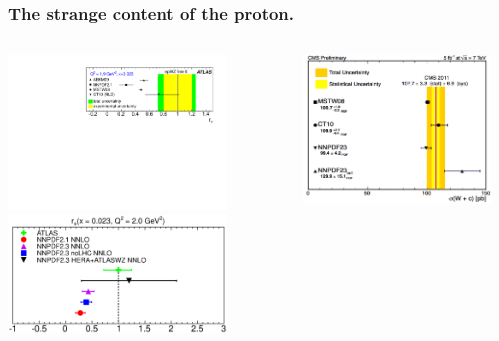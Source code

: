 \documentclass[10pt]{beamer}
\begin{document}
\begin{frame}
\frametitle{The strange content of the proton.}

    \begin{columns}
  \begin{column}{0.5\textwidth}
  \begin{center}
     \includegraphics[width=0.8\textwidth]{fig2.pdf}\\
       \includegraphics[width=0.8\textwidth]{rs-2.eps}
       \end{center}
               \end{column}
  \begin{column}{0.5\textwidth}

    \begin{center}

   \includegraphics[width=0.9\textwidth]{CMSWc.png}
       \end{center}


\end{column}
\end{columns}
\end{frame}
\end{document}
